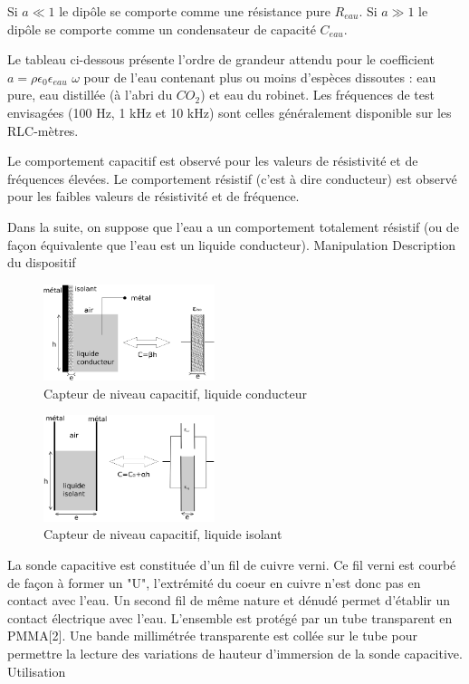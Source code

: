 \documentclass{article}%
\begin{document}
Si $a\ll 1$ le dipôle se comporte comme une résistance pure $R_{eau}$. Si $a\gg 1$ le dipôle se comporte comme un condensateur de capacité $C_{eau}$.

Le tableau ci-dessous présente l'ordre de grandeur attendu pour le coefficient $a=\rho \epsilon_{0}\epsilon_{eau}$ $\omega$ pour de l'eau contenant plus ou moins d'espèces dissoutes : eau pure, eau distillée (à l'abri du $CO_{2}$) et eau du robinet. Les fréquences de test envisagées (100 Hz, 1 kHz et 10 kHz) sont celles généralement disponible sur les RLC-mètres. 

Le comportement capacitif est observé pour les valeurs de résistivité et de fréquences élevées. Le comportement résistif (c'est à dire conducteur) est observé pour les faibles valeurs de résistivité et de fréquence.

Dans la suite, on suppose que l'eau a un comportement totalement résistif (ou de façon équivalente que l'eau est un liquide conducteur).
Manipulation
Description du dispositif
\begin{figure}
	\centerline{\includegraphics[width=5cm]{images-exp/NiveauCapa-liqcon.png}}
	\caption{Capteur de niveau capacitif, liquide conducteur}
\end{figure}
\begin{figure}
	\centerline{\includegraphics[width=5cm]{images-exp/NiveauCapa-liqiso.png}}
	\caption{Capteur de niveau capacitif, liquide isolant}
\end{figure}

La sonde capacitive est constituée d'un fil de cuivre verni. Ce fil verni est courbé de façon à former un "U", l'extrémité du coeur en cuivre n'est donc pas en contact avec l'eau. Un second fil de même nature et dénudé permet d'établir un contact électrique avec l'eau. L'ensemble est protégé par un tube transparent en PMMA[2]. Une bande millimétrée transparente est collée sur le tube pour permettre la lecture des variations de hauteur d'immersion de la sonde capacitive.
Utilisation
\end{document}
